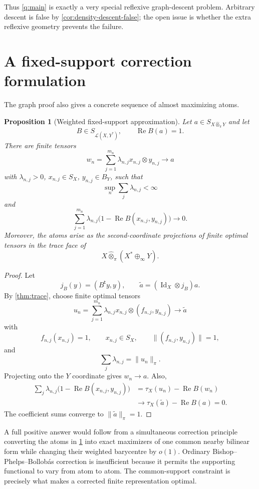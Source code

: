 \documentclass[11pt]{article}
\newtheorem{proposition}[proposition]{Proposition}
\theoremstyle{definition}
\theoremstyle{remark}
\newcommand{\whot}{\widehat\otimes_\pi}
\newcommand{\Lin}{\mathcal L}
\newcommand{\Rea}{\operatorname{Re}}
\newcommand{\id}{\operatorname{Id}}
\begin{document}
Thus \cref{q:main} is exactly a very special reflexive graph-descent problem.  Arbitrary descent is false by \cref{cor:density-descent-false}; the open issue is whether the extra reflexive geometry prevents the failure.

\section{A fixed-support correction formulation}

The graph proof also gives a concrete sequence of almost maximizing atoms.

\begin{proposition}[Weighted fixed-support approximation]\label{prop:weighted}
Let $a\in S_{X\whot Y}$ and let
\[
 B\in S_{\Lin(X,Y^*)},
 \qquad
 \Rea B(a)=1.
\]
There are finite tensors
\[
 w_n=\sum_{j=1}^{m_n}\lambda_{n,j}x_{n,j}\otimes y_{n,j}
 \longrightarrow a
\]
with $\lambda_{n,j}>0$, $x_{n,j}\in S_X$, $y_{n,j}\in B_Y$, such that
\[
 \sup_n\sum_j\lambda_{n,j}<\infty
\]
and
\[
 \sum_{j=1}^{m_n}\lambda_{n,j}
 \bigl(1-\Rea B(x_{n,j},y_{n,j})\bigr)
 \longrightarrow0.
\]
Moreover, the atoms arise as the second-coordinate projections of finite optimal tensors in the trace face of
\[
 X\whot(X^*\oplus_\infty Y).
\]
\end{proposition}

\begin{proof}
Let
\[
 j_B(y)=(B^{\mathsf t}y,y),
 \qquad
 \widetilde a=(\id_X\otimes j_B)a.
\]
By \cref{thm:trace}, choose finite optimal tensors
\[
 u_n=\sum_{j=1}^{m_n}\lambda_{n,j}
 x_{n,j}\otimes(f_{n,j},y_{n,j})
 \longrightarrow\widetilde a
\]
with
\[
 f_{n,j}(x_{n,j})=1,
 \qquad
 x_{n,j}\in S_X,
 \qquad
 \|(f_{n,j},y_{n,j})\|=1,
\]
and
\[
 \sum_j\lambda_{n,j}=\|u_n\|_\pi.
\]
Projecting onto the $Y$ coordinate gives $w_n\to a$.  Also,
\begin{align*}
 \sum_j\lambda_{n,j}
 \bigl(1-\Rea B(x_{n,j},y_{n,j})\bigr)
 &=\tau_X(u_n)-\Rea B(w_n)\\
 &\longrightarrow \tau_X(\widetilde a)-\Rea B(a)=0.
\end{align*}
The coefficient sums converge to $\|\widetilde a\|_\pi=1$.
\end{proof}

A full positive answer would follow from a simultaneous correction principle converting the atoms in \cref{prop:weighted} into exact maximizers of one common nearby bilinear form while changing their weighted barycentre by $o(1)$.  Ordinary Bishop--Phelps--Bollob\'as correction is insufficient because it permits the supporting functional to vary from atom to atom.  The common-support constraint is precisely what makes a corrected finite representation optimal.
\end{document}
